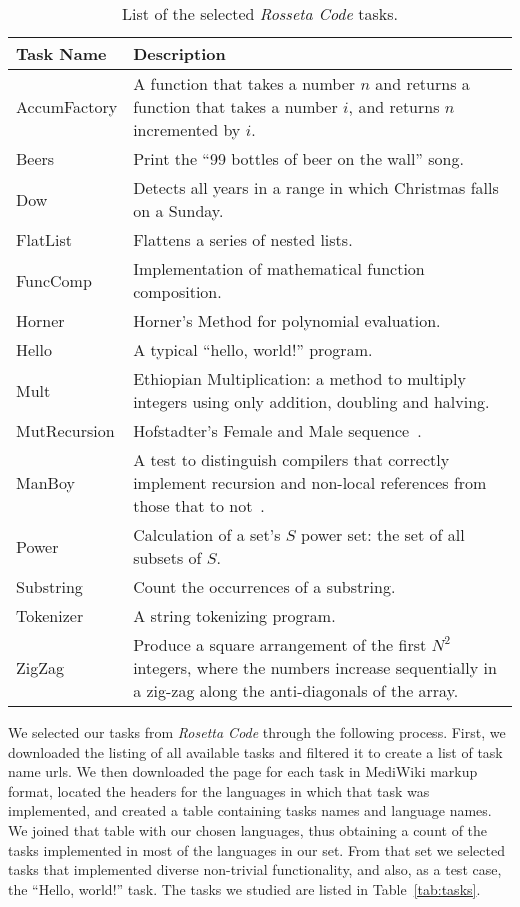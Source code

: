 \documentclass[10pt]{sigplanconf}
\begin{document}
\begin{table}
\begin{center}
\begin{tabular}{ l p{5cm}}
Task Name & Description\\
\hline
AccumFactory & A function that takes a number $n$ and returns a function that takes a number $i$,
and returns $n$ incremented by $i$. \\
Beers & Print the ``99 bottles of beer on the wall'' song.\\
Dow & Detects all years in a range in which Christmas falls on a Sunday.\\
FlatList & Flattens a series of nested lists.\\
FuncComp & Implementation of mathematical function composition.\\
Horner & Horner's Method for polynomial evaluation.\\
Hello & A typical ``hello, world!'' program.\\
Mult & Ethiopian Multiplication: a method to multiply integers using only addition, doubling and halving.\\
MutRecursion & Hofstadter's Female and Male sequence~\cite{Hof89}.\\
ManBoy & A test to distinguish compilers that correctly implement
recursion and non-local references from those that to not~\cite{Knu64}.  \\
Power & Calculation of a set's $S$ power set: the set of all subsets of $S$.\\
Substring & Count the occurrences of a substring.\\
Tokenizer & A string tokenizing program.\\
ZigZag & Produce a square arrangement of the first $N^2$ integers,
where the numbers increase sequentially in a zig-zag along the anti-diagonals of the array.\\
\end{tabular}
\end{center}
\caption{List of the selected {\em Rosseta Code} tasks.}
\label{tab:Tasks}
\end{table}

We selected our tasks from {\em Rosetta Code} through the following process.
First, we downloaded the listing of all available tasks and
filtered it to create a list of task name {\sc url}s.
We then downloaded the page for each task in MediWiki markup format,
located the headers for the languages in which that task was implemented, and
created a table containing tasks names and language names.
We joined that table with our chosen languages,
thus obtaining a count of the tasks implemented in
most of the languages in our set.
From that set we selected tasks that implemented diverse
non-trivial functionality,
and also, as a test case, the ``Hello, world!'' task.
The tasks we studied are listed in Table~\ref{tab:tasks}.
\end{document}
